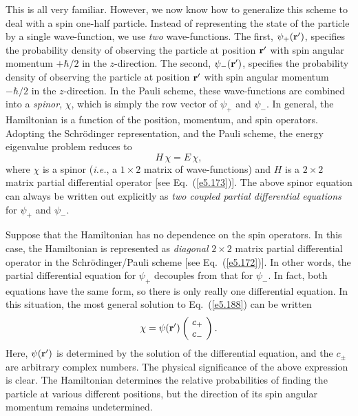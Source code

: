 This is all very familiar. However, we now know how to generalize this scheme
to  deal with  a spin one-half particle. Instead of representing the 
state of the particle by a single wave-function, we use {\em two} wave-functions.
The first, $\psi_+({\bf r'})$, specifies the probability density of
observing the particle at position ${\bf r}'$
with spin angular momentum $+\hbar/2$ 
in the  $z$-direction. The second, $\psi_-({\bf r'})$, specifies the
 probability density of
observing the particle at position ${\bf r}'$  with spin angular momentum $-\hbar/2$ 
in the $z$-direction. In the Pauli scheme, these wave-functions
are combined into a {\em spinor}, $\chi$, which is simply the row vector of $\psi_+$ and $\psi_-$. 
In general, the Hamiltonian is a function of the position, momentum, and spin
operators. Adopting the Schr\"{o}dinger representation, and the Pauli scheme,
the energy eigenvalue problem reduces to 
\begin{equation}\label{e5.188}
H \,\chi = E \,\chi,
\end{equation}
where $\chi$ is a spinor ({\em i.e.}, a $1\times 2$
 matrix of wave-functions)
 and $H$ is a $2\times 2$ matrix partial differential operator [see Eq.~(\ref{e5.173})]. 
The above spinor equation can always be  written out explicitly  as {\em two
coupled partial differential equations} for $\psi_+$ and $\psi_-$. 

Suppose that the Hamiltonian has no dependence on the spin operators. In this
case, the Hamiltonian is represented as {\em diagonal}\/ $2\times 2$ matrix partial
differential operator in the Schr\"{o}dinger/Pauli scheme [see Eq.~(\ref{e5.172})].
In other words, the partial differential equation for $\psi_+$ decouples
from that for $\psi_-$. In fact, both equations have the same form, so there
is only really one differential equation.  In this
situation, the most general  solution to Eq.~(\ref{e5.188})  can be written
\begin{equation}\label{e5.189}
\chi = \psi({\bf r}') \left(\!\begin{array}{c} c_+\\ c_-\end{array}\!\right).
\end{equation}
Here, $\psi({\bf r}')$ is determined by the solution of the differential equation,
and the $c_\pm$ are arbitrary complex numbers. The physical significance of
the above expression is clear. The Hamiltonian determines the relative probabilities
of finding the particle at various different positions, but the direction
of its spin angular momentum remains undetermined.

